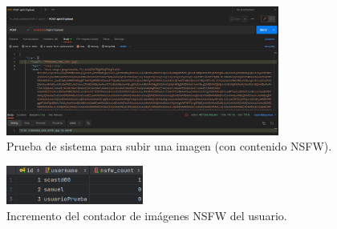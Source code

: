 \begin{itemize}
	\begin{figure}[H]
		\centering
		\includegraphics[width=0.8\textwidth]{res/images/postman-system-test-upload-image-nsfw}
		\caption{Prueba de sistema para subir una imagen (con contenido NSFW).}
		\label{fig:postman-test-2}
	\end{figure}

	\begin{figure}[H]
		\centering
		\includegraphics[width=0.4\textwidth]{res/images/postman-system-test-upload-image-nsfw-db}
		\caption{Incremento del contador de imágenes NSFW del usuario.}
		\label{fig:postman-test-2-db}
	\end{figure}
\end{itemize}
